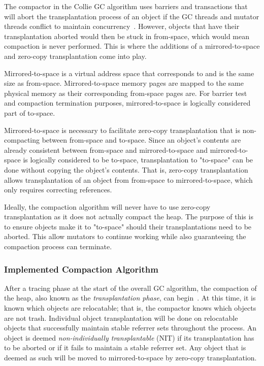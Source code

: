 \documentclass{sig-alternate}
\begin{document}
The compactor in the Collie GC algorithm uses barriers 
and transactions that will abort the transplantation process of an object if the
GC threads and mutator threads conflict to maintain concurrency~\cite{Iyengar:Collie}.
However, objects that have their transplantation aborted would then be stuck
in from-space, which would mean compaction is never performed. This is where
the additions of a mirrored-to-space and zero-copy transplantation come into play.

Mirrored-to-space is a virtual address space that corresponds to and is the same
size as from-space. Mirrored-to-space memory pages are mapped to the same physical
memory as their corresponding from-space pages are. For barrier test and compaction 
termination purposes, mirrored-to-space is logically considered part of to-space.

Mirrored-to-space is necessary to facilitate zero-copy transplantation that is 
non-compacting between from-space and to-space. Since an object's contents are 
already consistent between from-space and mirrored-to-space and mirrored-to-space
is logically considered to be to-space, transplantation to "to-space"
can be done without copying the object's contents. That is, zero-copy transplantation
allows transplantation of an object from from-space to mirrored-to-space, which only
requires correcting references.

Ideally, the compaction algorithm will never have to use zero-copy transplantation
as it does not actually compact the heap. The purpose of this is to ensure
objects make it to "to-space" should their transplantations need to be aborted. 
This allow mutators to continue working while also guaranteeing the compaction 
process can terminate.


\subsubsection{Implemented Compaction Algorithm}
\label{sec:collieAlgorithmImplementation}

After a tracing phase at the start of the overall GC algorithm, the compaction of
the heap, also known as the \emph{transplantation phase}, can begin~\cite{Iyengar:Collie}.
At this time, it is known which objects are relocatable; that is, the compactor knows which 
objects are not trash. Individual object transplantation will be done on relocatable objects 
that successfully maintain stable referrer sets throughout the process.
An object is deemed \emph{non-individually transplantable} (NIT) if its transplantation
has to be aborted or if it fails to maintain a stable referrer set. 
Any object that is deemed as such will be moved to mirrored-to-space by zero-copy 
transplantation.
\end{document}
